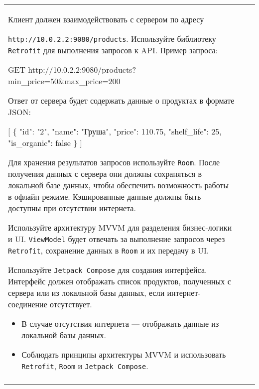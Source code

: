 \documentclass[a4paper]{article}
\begin{document}
\begin{tabular}{!{\vrule width 2pt}p{5cm}|p{6cm}|p{4cm}!{\vrule width 2pt}}
{\begin{minipage}{16cm}
\begin{enumerate}
Клиент должен взаимодействовать с сервером по адресу 

\texttt{http://10.0.2.2:9080/products}. Используйте библиотеку \texttt{Retrofit} для выполнения запросов к API. Пример запроса:


GET http://10.0.2.2:9080/products?
min\_price=50\&max\_price=200


Ответ от сервера будет содержать данные о продуктах в формате JSON:


[
  \{
    "id": "2",
    "name": "Груша",
    "price": 110.75,
    "shelf\_life": 25,
    "is\_organic": false
  \}
]


Для хранения результатов запросов используйте \texttt{Room}. После получения данных с сервера они должны сохраняться в локальной базе данных, чтобы обеспечить возможность работы в офлайн-режиме. Кэшированные данные должны быть доступны при отсутствии интернета.

Используйте архитектуру MVVM для разделения бизнес-логики и UI. \texttt{ViewModel} будет отвечать за выполнение запросов через \texttt{Retrofit}, сохранение данных в \texttt{Room} и их передачу в UI.

Используйте \texttt{Jetpack Compose} для создания интерфейса. Интерфейс должен отображать список продуктов, полученных с сервера или из локальной базы данных, если интернет-соединение отсутствует.

\begin{itemize}
  \item В случае отсутствия интернета — отображать данные из локальной базы данных.
  \item Соблюдать принципы архитектуры MVVM и использовать \texttt{Retrofit}, \texttt{Room} и \texttt{Jetpack Compose}.
\end{itemize} 
\end{enumerate}

\vspace{0.2cm}
    
\end{minipage}
}
\\
\end{tabular}
\end{document}

